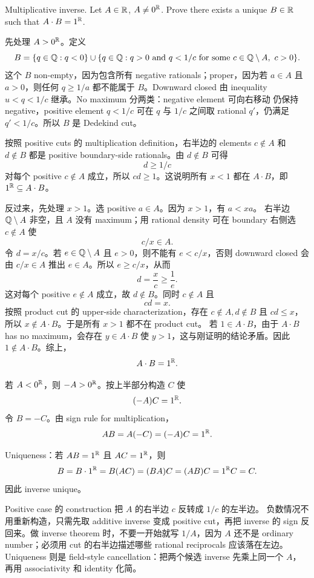 \begin{exerciseblock}
Multiplicative inverse. Let \(A\in\mathbb{R}\), \(A\ne0^{\mathbb{R}}\). Prove there exists a
unique \(B\in\mathbb{R}\) such that \(A\cdot B=1^{\mathbb{R}}\).
\end{exerciseblock}

\begin{solution}
先处理 \(A>0^{\mathbb{R}}\)。定义
\[
  B=\{q\in\mathbb{Q}:q<0\}\cup
    \{q\in\mathbb{Q}:q>0\text{ and }q<1/c
      \text{ for some }c\in\mathbb{Q}\setminus A,\ c>0\}.
\]
这个 \(B\) non-empty，因为包含所有 negative rationals；proper，因为若
\(a\in A\) 且 \(a>0\)，则任何 \(q\geq1/a\) 都不能属于 \(B\)。Downward closed
由 inequality \(u<q<1/c\) 继承。No maximum 分两类：negative element 可向右移动
仍保持 negative，positive element \(q<1/c\) 可在 \(q\) 与 \(1/c\) 之间取 rational
\(q'\)，仍满足 \(q'<1/c\)。所以 \(B\) 是 Dedekind cut。

按照 positive cuts 的 multiplication definition，右半边的 elements \(c\notin A\)
和 \(d\notin B\) 都是 positive boundary-side rationals。由 \(d\notin B\) 可得
\[
  d\geq 1/c
\]
对每个 positive \(c\notin A\) 成立，所以 \(cd\geq1\)。这说明所有 \(x<1\) 都在
\(A\cdot B\)，即 \(1^{\mathbb{R}}\subseteq A\cdot B\)。

反过来，先处理 \(x>1\)。选 positive \(a\in A\)。因为 \(x>1\)，有 \(a<xa\)。
右半边 \(\mathbb{Q}\setminus A\) 非空，且 \(A\) 没有 maximum；用 rational density 可在
boundary 右侧选 \(c\notin A\) 使
\[
  c/x\in A.
\]
令 \(d=x/c\)。若 \(e\in\mathbb{Q}\setminus A\) 且 \(e>0\)，则不能有 \(e<c/x\)，否则
downward closed 会由 \(c/x\in A\) 推出 \(e\in A\)。所以 \(e\geq c/x\)，从而
\[
  d=\frac{x}{c}\geq \frac1e.
\]
这对每个 positive \(e\notin A\) 成立，故 \(d\notin B\)。同时 \(c\notin A\) 且
\[
  cd=x.
\]
按照 product cut 的 upper-side characterization，存在 \(c\notin A,d\notin B\)
且 \(cd\leq x\)，所以 \(x\notin A\cdot B\)。于是所有 \(x>1\) 都不在 product cut。
若 \(1\in A\cdot B\)，由于 \(A\cdot B\) has no maximum，会存在 \(y\in A\cdot B\)
使 \(y>1\)，这与刚证明的结论矛盾。因此 \(1\notin A\cdot B\)。综上，
\[
  A\cdot B=1^{\mathbb{R}}.
\]

若 \(A<0^{\mathbb{R}}\)，则 \(-A>0^{\mathbb{R}}\)。按上半部分构造 \(C\) 使
\[
  (-A)C=1^{\mathbb{R}}.
\]
令 \(B=-C\)。由 sign rule for multiplication，
\[
  A B=A(-C)=(-A)C=1^{\mathbb{R}}.
\]

Uniqueness：若 \(AB=1^{\mathbb{R}}\) 且 \(AC=1^{\mathbb{R}}\)，则
\[
  B=B\cdot1^{\mathbb{R}}=B(AC)=(BA)C=(AB)C=1^{\mathbb{R}}C=C.
\]
因此 inverse unique。
\end{solution}

\begin{explanation}
Positive case 的 construction 把 \(A\) 的右半边 \(c\) 反转成 \(1/c\) 的左半边。
负数情况不用重新构造，只需先取 additive inverse 变成 positive cut，再把 inverse
的 sign 反回来。做 inverse theorem 时，不要一开始就写 \(1/A\)，因为 \(A\) 还不是
ordinary number；必须用 cut 的右半边描述哪些 rational reciprocals 应该落在左边。
Uniqueness 则是 field-style cancellation：把两个候选 inverse 先乘上同一个 \(A\)，
再用 associativity 和 identity 化简。
\end{explanation}


